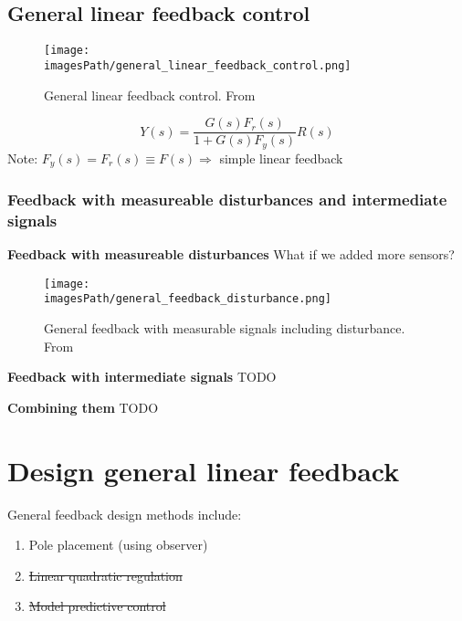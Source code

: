 \subsection{General linear feedback control}
\begin{figure}[!h]
    \centering
    \texttt{[image: \\imagesPath/general\_linear\_feedback\_control.png]}
    \caption{General linear feedback control. From \cite{}}
    \label{fig:general_linear_feedback_control}
\end{figure}

\begin{equation*}
    Y(s) = \frac{G(s)F_r(s)}{1+G(s)F_y(s)}R(s)
\end{equation*}
Note: $F_y(s) = F_r(s) \equiv F(s) \Rightarrow$ simple linear feedback

\subsubsection{Feedback with measureable disturbances and intermediate signals}
\textbf{Feedback with measureable disturbances}
What if we added more sensors?
\begin{figure}[!h]
    \centering
    \texttt{[image: \\imagesPath/general\_feedback\_disturbance.png]}
    \caption{General feedback with measurable signals including disturbance. From \cite{}}
    \label{fig:general_feedback_disturbance}
\end{figure}

\textbf{Feedback with intermediate signals}
TODO

\textbf{Combining them}
TODO


\section{Design general linear feedback}
General feedback design methods include:
\begin{enumerate}
    \item Pole placement (using observer)
    \item \sout{Linear quadratic regulation}
    \item \sout{Model predictive control}
\end{enumerate}

